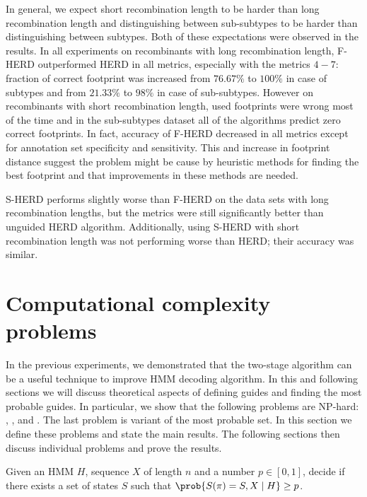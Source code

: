 In general, we expect short recombination length to be harder than long
recombination length and distinguishing between sub-subtypes to be harder than
distinguishing between subtypes. Both of these expectations were observed in
the results. In all experiments on recombinants with long recombination length,
F-HERD outperformed HERD in all metrics, especially with the metrics $4-7$:
fraction of correct footprint was increased from $76.67\%$ to $100\%$ in case of
subtypes and from $21.33\%$ to $98\%$ in case of sub-subtypes. However on
recombinants with short recombination length, used footprints were wrong most
of the time and in the sub-subtypes dataset all of the algorithms predict zero
correct footprints.  In fact, accuracy of F-HERD decreased in all metrics
except for annotation set specificity and sensitivity. This and
increase in footprint distance suggest the problem might be cause by heuristic
methods for finding the best footprint and that improvements in these methods
are needed.


S-HERD performs slightly worse than F-HERD on the data sets with long
recombination lengths, but the metrics were still significantly better than
unguided HERD algorithm.  Additionally, using S-HERD with short recombination
length was not performing worse than HERD; their accuracy was similar.

\section{Computational complexity problems}

In the previous experiments, we demonstrated that the two-stage algorithm can
be a useful technique to improve HMM decoding algorithm. In this and following
sections we will discuss theoretical aspects of defining guides and finding the
most probable guides. In particular, we show that the following problems are
NP-hard: , , and . The last problem is
variant of the most probable set. In this section we define these problems and
state the main results. The following sections then discuss individual problems
and prove the results.

\begin{definition} Given an HMM $H$, sequence $X$ of
length $n$ and a number $p\in [0,1]$, decide if there exists a set of states $S$
such that $\prob{S(\pi) = S, X\mid H} \geq p$.
\end{definition}

